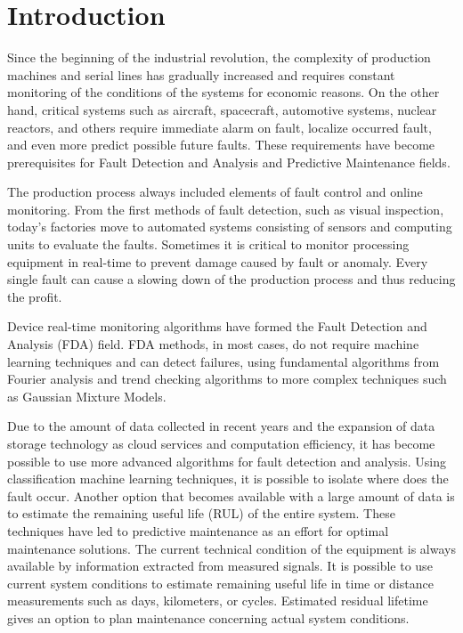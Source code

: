 \chapter{Introduction}
Since the beginning of the industrial revolution, the complexity of
production machines and serial lines has gradually increased and requires
constant monitoring of the conditions of the systems for economic reasons.
On the other hand, critical systems such as aircraft, spacecraft,
automotive systems, nuclear reactors, and others require immediate alarm on
fault, localize occurred fault, and even more predict possible future
faults.  These requirements have become prerequisites for Fault Detection
and Analysis and Predictive Maintenance fields.

The production process always included elements of fault control and online
monitoring. From the first methods of fault detection, such as visual
inspection, today's factories move to automated systems consisting of
sensors and computing units to evaluate the faults. Sometimes it is
critical to monitor processing equipment in real-time to prevent damage
caused by fault or anomaly. Every single fault can cause a slowing down of
the production process and thus reducing the profit.

Device real-time monitoring algorithms have formed the Fault Detection and
Analysis (FDA) field.  FDA methods, in most cases, do not require machine
learning techniques and can detect failures, using fundamental algorithms
from Fourier analysis and trend checking algorithms to more complex
techniques such as Gaussian Mixture Models.

Due to the amount of data collected in recent years and the expansion of
data storage technology as cloud services and computation efficiency, it
has become possible to use more advanced algorithms for fault detection and
analysis. Using classification machine learning techniques, it is possible
to isolate where does the fault occur.  Another option that becomes
available with a large amount of data is to estimate the remaining useful
life (RUL) of the entire system. These techniques have led to predictive
maintenance as an effort for optimal maintenance solutions. The current
technical condition of the equipment is always available by information
extracted from measured signals. It is possible to use current system
conditions to estimate remaining useful life in time or distance
measurements such as days, kilometers, or cycles. Estimated residual
lifetime gives an option to plan maintenance concerning actual system
conditions.

